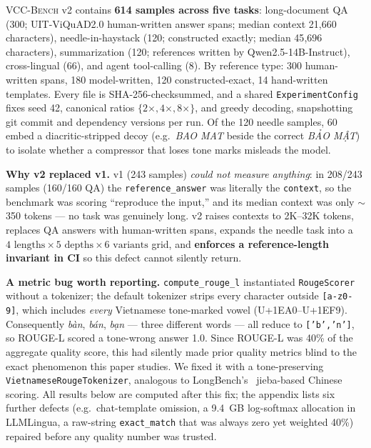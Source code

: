 \documentclass[runningheads]{llncs}
\newcommand{\method}[1]{\textsc{#1}}
\newcommand{\viet}[1]{\textit{#1}}
\begin{document}
\method{VCC-Bench} v2 contains \textbf{614 samples across five tasks}: long-document QA (300; UIT-ViQuAD2.0 human-written answer spans; median context 21{,}660 characters), needle-in-haystack (120; constructed exactly; median 45{,}696 characters), summarization (120; references written by Qwen2.5-14B-Instruct), cross-lingual (66), and agent tool-calling (8). By reference type: 300 human-written spans, 180 model-written, 120 constructed-exact, 14 hand-written templates. Every file is SHA-256-checksummed, and a shared \texttt{ExperimentConfig} fixes seed 42, canonical ratios $\{2\times,4\times,8\times\}$, and greedy decoding, snapshotting git commit and dependency versions per run. Of the 120 needle samples, 60 embed a diacritic-stripped decoy (e.g.\ \viet{BAO MAT} beside the correct \viet{BẢO MẬT}) to isolate whether a compressor that loses tone marks misleads the model.

\textbf{Why v2 replaced v1.} v1 (243 samples) \emph{could not measure anything}: in 208/243 samples (160/160 QA) the \texttt{reference\_answer} was literally the \texttt{context}, so the benchmark was scoring ``reproduce the input,'' and its median context was only $\sim$350 tokens --- no task was genuinely long. v2 raises contexts to 2K--32K tokens, replaces QA answers with human-written spans, expands the needle task into a $4\text{ lengths}\times5\text{ depths}\times6\text{ variants}$ grid, and \textbf{enforces a reference-length invariant in CI} so this defect cannot silently return.

\textbf{A metric bug worth reporting.} \texttt{compute\_rouge\_l} instantiated \texttt{RougeScorer} without a tokenizer; the default tokenizer strips every character outside \texttt{[a-z0-9]}, which includes \emph{every} Vietnamese tone-marked vowel (U+1EA0--U+1EF9). Consequently \viet{bàn}, \viet{bán}, \viet{bạn} --- three different words --- all reduce to \texttt{['b','n']}, so ROUGE-L scored a tone-wrong answer 1.0. Since ROUGE-L was 40\% of the aggregate quality score, this had silently made prior quality metrics blind to the exact phenomenon this paper studies. We fixed it with a tone-preserving \texttt{VietnameseRougeTokenizer}, analogous to LongBench's~\cite{bai2023longbench} jieba-based Chinese scoring. All results below are computed after this fix; the appendix lists six further defects (e.g.\ chat-template omission, a 9.4~GB log-softmax allocation in LLMLingua, a raw-string \texttt{exact\_match} that was always zero yet weighted 40\%) repaired before any quality number was trusted.
\end{document}
